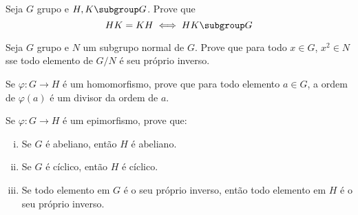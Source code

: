 \begin{exercise}
	Seja $G$ grupo e $H,K \subgroup G$. Prove que
	$$
		HK = KH \iff HK \subgroup G
	$$
\end{exercise}

\begin{exercise}
	Seja $G$ grupo e $N$ um subgrupo normal de $G$. Prove que para todo $x \in G$, $x^2 \in N$ sse todo elemento de $G/N$ é seu próprio inverso.
\end{exercise}

\begin{exercise}
	Se $\varphi : G \to H$ é um homomorfismo, prove que para todo elemento $a \in G$, a ordem de $\varphi(a)$ é um divisor da ordem de $a$.
\end{exercise}

\begin{exercise}
	Se $\varphi : G \to H$ é um epimorfismo, prove que:
	\begin{enumerate}[(i)]
		\item Se $G$ é abeliano, então $H$ é abeliano.
		\item Se $G$ é cíclico, então $H$ é cíclico.
		\item Se todo elemento em $G$ é o seu próprio inverso, então todo elemento em $H$ é o seu próprio inverso.
	\end{enumerate}
\end{exercise}
